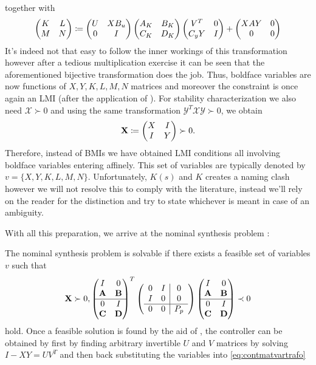 together with
\begin{equation}
\begin{pmatrix}K&L\\M&N\end{pmatrix}\coloneqq \begin{pmatrix}U&XB_u\\0&I\end{pmatrix}\begin{pmatrix}A_K  & B_K \\C_K  & D_K\end{pmatrix}
\begin{pmatrix}V^T&0\\C_yY&I\end{pmatrix}+\begin{pmatrix}XAY&0\\0&0\end{pmatrix}
\label{eq:contmatvartrafo}
\end{equation}
It's indeed not that easy to follow the inner workings of this transformation however after a tedious multiplication exercise
it can be seen that the aforementioned bijective transformation does the job. Thus, boldface variables are now functions of 
$X,Y,K,L,M,N$ matrices and moreover the constraint is once again an LMI (after the application of ). For 
stability characterization we also need $\mathcal{X}\succ 0$ and using the same transformation 
$\mathcal{Y}^T\mathcal{X}\mathcal{Y}\succ 0$, we obtain
\[
\mathbf{X} \coloneqq \begin{pmatrix}X&I\\I&Y\end{pmatrix}\succ 0.
\]
Therefore, instead of BMIs we have obtained LMI conditions all involving boldface variables entering affinely. This set of variables 
are typically denoted by $v=\{X,Y,K,L,M,N\}$. Unfortunately, $K(s)$ and $K$ creates a naming clash however we will not resolve this 
to comply with the literature, instead we'll rely on the reader for the distinction and try to state whichever is meant in case of an
ambiguity. 

With all this preparation, we arrive at the nominal synthesis problem : 
\begin{thm}\label{thm:nomsynthLMI} The nominal synthesis problem is solvable if there exists a feasible set of 
variables $v$ such that
\begin{equation}
\mathbf{X}\succ 0,\begin{pmatrix}I&0\\\mathbf{A}&\mathbf{B}\\\hline 0&I\\\mathbf{C}&\mathbf{D}\end{pmatrix}^T
\left(
\begin{array}{cc|c}
	0&I&0\\I&0&0\\\hline 0&0&P_p
\end{array}
\right)
\begin{pmatrix}I&0\\\mathbf{A}&\mathbf{B}\\\hline 0&I\\\mathbf{C}&\mathbf{D}\end{pmatrix} \prec 0
\label{eq:nomsynthLMI}
\end{equation}
hold. Once a feasible solution is found by the aid of , the controller can be obtained by first by finding arbitrary 
invertible $U$ and $V$ matrices by solving $I-XY= UV^T$ and then back substituting the variables into \eqref{eq:contmatvartrafo}
\end{thm}

